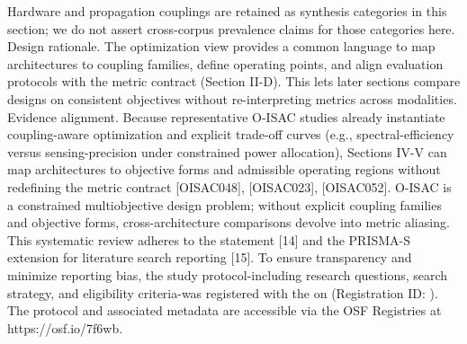 {}Hardware and propagation couplings are retained as synthesis categories in this section; we do not assert cross-corpus prevalence claims for those categories here.\markdownRendererInterblockSeparator
{}
\markdownRendererSectionEnd \markdownRendererSectionBegin
{}\markdownRendererInterblockSeparator
{}Design rationale. The optimization view provides a common language to map architectures to coupling families, define operating points, and align evaluation protocols with the metric contract (Section II-D). This lets later sections compare designs on consistent objectives without re-interpreting metrics across modalities.\markdownRendererParagraphSeparator
{}Evidence alignment. Because representative O-ISAC studies already instantiate coupling-aware optimization and explicit trade-off curves (e.g., spectral-efficiency versus sensing-precision under constrained power allocation), Sections IV-V can map architectures to objective forms and admissible operating regions without redefining the metric contract [O\markdownRendererUnderscore{}ISAC\markdownRendererUnderscore{}048], [O\markdownRendererUnderscore{}ISAC\markdownRendererUnderscore{}023], [O\markdownRendererUnderscore{}ISAC\markdownRendererUnderscore{}052].\markdownRendererParagraphSeparator
{} O-ISAC is a constrained multiobjective design problem; without explicit coupling families and objective forms, cross-architecture comparisons devolve into metric aliasing.\markdownRendererInterblockSeparator
{}
\markdownRendererSectionEnd 
\markdownRendererSectionEnd 
\markdownRendererSectionEnd \markdownRendererSectionBegin
{}\markdownRendererInterblockSeparator
{}\markdownRendererSectionBegin
{}\markdownRendererInterblockSeparator
{}This systematic review adheres to the  statement [14] and the PRISMA-S extension for literature search reporting [15]. To ensure transparency and minimize reporting bias, the study protocol-including research questions, search strategy, and eligibility criteria-was registered with the  on  (Registration ID: ). The protocol and associated metadata are accessible via the OSF Registries at https://osf.io/7f6wb.\markdownRendererInterblockSeparator

